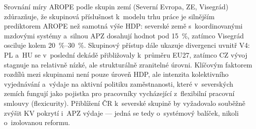 Srovnání míry \ac{AROPE} podle skupin zemí (Severní Evropa, ZE, Visegrád) zdůrazňuje, že skupinová příslušnost k~modelu trhu práce je silnějším prediktorem \ac{AROPE} než samotná výše \ac{HDP}: severské země s~koordinovanými mzdovými systémy a~silnou \ac{APZ} dosahují hodnot pod \SI{15}{\percent}, zatímco Visegrád osciluje kolem \SIrange{20}{30}{\percent}.
Skupinový přístup dále ukazuje divergenci uvnitř V4: PL a~HU se v~poslední dekádě přibližovaly k~průměru EU27, zatímco CZ vývoj stagnuje na relativně nízké, ale strukturálně zranitelné úrovni.
Klíčovým faktorem rozdílů mezi skupinami není pouze úroveň \ac{HDP}, ale intenzita kolektivního vyjednávání a~výdaje na aktivní politiku zaměstnanosti, které v~severských zemích fungují jako pojistka pro pracovníky vycházející z~flexibilní pracovní smlouvy (flexicurity).
Přiblížení ČR k~severské skupině by vyžadovalo souběžně zvýšit \ac{KV} pokrytí i~\ac{APZ} výdaje --- jedná se tedy o~systémový balíček, nikoli o~izolovanou reformu.


